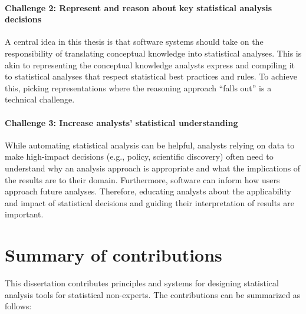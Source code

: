

\def\thesisChallengeRep{\textbf{Thesis Challenge 2: Representation and automated reasoning}}
\paragraph{Challenge 2: Represent and reason about key statistical analysis decisions} %
A central idea in this thesis is that software systems should take on the
responsibility of translating conceptual knowledge into statistical analyses.
This is akin to representing the conceptual
knowledge analysts express and compiling it to statistical
analyses that respect statistical best practices and rules. 
To achieve this, picking representations where the reasoning approach ``falls out'' is a technical challenge.

\def\thesisChallengeUnderstanding{\textbf{Thesis Challenge 3: Statistical understanding}}
\paragraph{Challenge 3: Increase analysts' statistical understanding} %
While automating statistical analysis can be helpful, analysts relying on data
to make high-impact decisions (e.g., policy, scientific discovery) often need to
understand why an analysis approach is appropriate and what the implications of
the results are to their domain. Furthermore, software can inform how users
approach future analyses. Therefore, educating analysts about the applicability
and impact of statistical decisions and guiding their interpretation of results
are important.

\section{Summary of contributions}
This dissertation contributes principles and systems for designing statistical analysis
tools for statistical non-experts. The contributions can be summarized as follows: 

